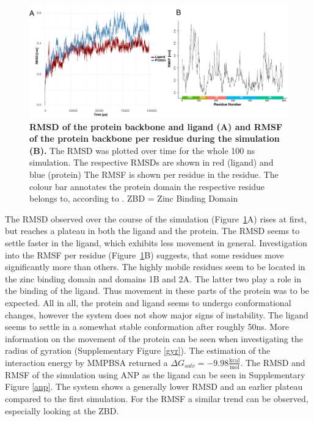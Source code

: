 \documentclass[11pt, letterpaper, titlepage]{article}
\begin{document}
\begin{figure}[h]
  \begin{center}
    \includegraphics[width=1.0\textwidth]{RMSD_RMSF_combined.pdf}
  \end{center}
  \caption{\textbf{RMSD of the protein backbone and ligand (A) and RMSF of the protein backbone per residue during the simulation (B).} The RMSD was plotted over time for the whole 100 ns simulation. The respective RMSDs are shown in red (ligand) and blue (protein) The RMSF is shown per residue in the residue. The colour bar annotates the protein domain the respective residue belongs to, according to \textcite{Domains}. ZBD = Zinc Binding Domain}
  \label{rms}
\end{figure}
The \ac{RMSD} observed over the course of the simulation (Figure~\ref{rms}A) rises at first, but reaches a plateau in both the ligand and the protein. The RMSD seems to settle faster in the ligand, which exhibits less movement in general. Investigation into the RMSF per residue (Figure~\ref{rms}B) suggests, that some residues move significantly more than others. The highly mobile residues seem to be located in the zinc binding domain and domains 1B and 2A. The latter two play a role in the binding of the ligand. Thus movement in these parts of the protein was to be expected. All in all, the protein and ligand seems to undergo conformational changes, however the system does not show major signs of instability. The ligand seems to settle in a somewhat stable conformation after roughly 50ns. More information on the movement of the protein can be seen when investigating the radius of gyration (Supplementary Figure \ref{gyr}). The estimation of the interaction energy by MMPBSA returned a $\Delta G_{solv} = -9.98 \frac{\textrm{kcal}}{\textrm{mol}}$. The RMSD and RMSF of the simulation using ANP as the ligand can be seen in Supplementary Figure \ref{anp}. The system shows a generally lower RMSD and an earlier plateau compared to the first simulation. For the RMSF a similar trend can be observed, especially looking at the ZBD. 
\end{document}
